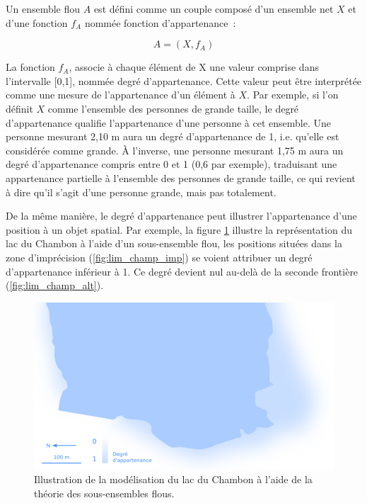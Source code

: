 Un ensemble flou $A$ est défini comme un couple composé d’un ensemble
net $X$ et d’une fonction $f_A$ nommée fonction d’appartenance :

\begin{equation}
  A = (X, f_A)  
\end{equation}

La fonction $f_A$, associe à chaque élément de X une valeur comprise
dans l’intervalle [0,1], nommée degré d’appartenance. Cette valeur
peut être interprétée comme une mesure de l’appartenance d’un élément
à $X$. Par exemple, si l’on définit $X$ comme l’ensemble des personnes
de grande taille, le degré d’appartenance qualifie l’appartenance
d’une personne à cet ensemble. Une personne mesurant 2,10 m aura un
degré d’appartenance de 1, i.e. qu’elle est considérée comme grande. À
l’inverse, une personne mesurant 1,75 m aura un degré d’appartenance
compris entre 0 et 1 (0,6 par exemple), traduisant une appartenance
partielle à l’ensemble des personnes de grande taille, ce qui revient
à dire qu’il s’agit d’une personne grande, mais pas totalement.

De la même manière, le degré d’appartenance peut illustrer
l’appartenance d’une position à un objet spatial. Par exemple, la
figure \ref{fig:champ_flou} illustre la représentation du lac du
Chambon à l’aide d’un sous-ensemble flou, les positions situées dans
la zone d’imprécision (\autoref{fig:lim_champ_imp}) se voient
attribuer un degré d’appartenance inférieur à 1. Ce degré devient nul
au-delà de la seconde frontière (\autoref{fig:lim_champ_alt}).

\begin{figure}
  \centering
  \includegraphics{../figures/fig6.png}
  \caption{Illustration de la modélisation du lac du Chambon à l’aide
    de la théorie des sous-ensembles flous.}
  \label{fig:champ_flou}
\end{figure}

